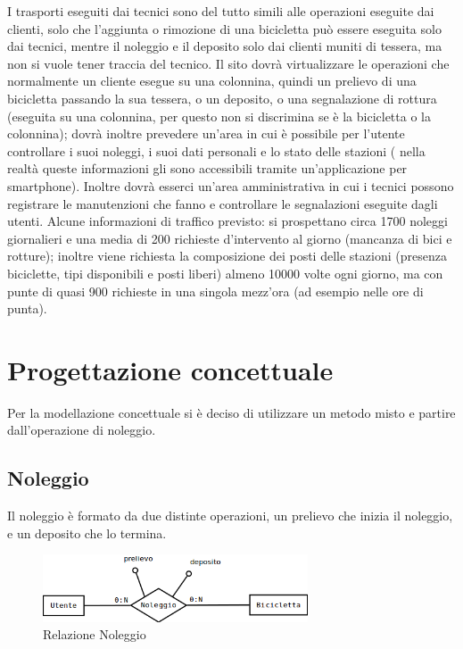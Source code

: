 \documentclass[a4paper,twoside]{article}
\begin{document}
I trasporti eseguiti dai tecnici sono del tutto simili alle operazioni eseguite dai clienti, solo che l'aggiunta o rimozione di una bicicletta può essere eseguita solo dai tecnici, mentre il noleggio e il deposito solo dai clienti muniti di tessera, ma non si vuole tener traccia del tecnico.\newline
Il sito dovrà virtualizzare le operazioni che normalmente un cliente esegue su una colonnina, quindi un prelievo di una bicicletta passando la sua tessera, o un deposito, o una segnalazione di rottura (eseguita su una colonnina, per questo non si discrimina se è la bicicletta o la colonnina); dovrà inoltre prevedere un'area in cui è possibile per l'utente controllare i suoi noleggi, i suoi dati personali e lo stato delle stazioni ( nella realtà queste informazioni gli sono accessibili tramite un'applicazione per smartphone). Inoltre dovrà esserci un'area amministrativa in cui i tecnici possono registrare le manutenzioni che fanno e controllare le segnalazioni eseguite dagli utenti.\newline
Alcune informazioni di traffico previsto: si prospettano circa 1700 noleggi giornalieri e una media di 200 richieste d'intervento al giorno (mancanza di bici e rotture); inoltre viene richiesta la composizione dei posti delle stazioni (presenza biciclette, tipi disponibili e posti liberi) almeno 10000 volte ogni giorno, ma con punte di quasi 900 richieste in una singola mezz'ora (ad esempio nelle ore di punta).
\section{Progettazione concettuale}
Per la modellazione concettuale si è deciso di utilizzare un metodo misto e partire dall'operazione di noleggio.
\subsection{Noleggio}
Il noleggio è formato da due distinte operazioni, un prelievo che inizia il noleggio, e un deposito che lo termina.
\begin{figure}[h]
 \centering
 \includegraphics[width=0.7\textwidth]{Concettuale01}
\caption{Relazione Noleggio}
\end{figure}
\end{document}
